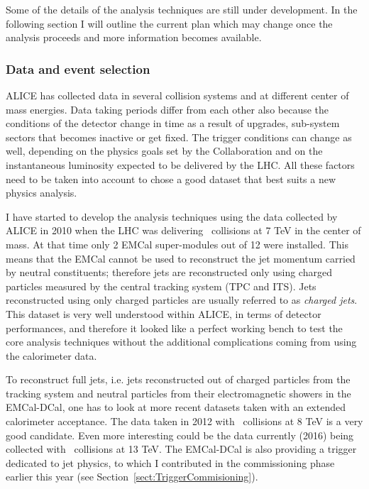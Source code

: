 \documentclass[12pt, a4paper, twoside, titlepage]{article}
\begin{document}
Some of the details of the analysis techniques are still under development. In the following section
I will outline the current plan which may change once the analysis proceeds and more information becomes available.

\subsubsection{Data and event selection}
ALICE has collected data in several collision systems and at different center of mass energies.
Data taking periods differ from each other also because the conditions of the detector change in time as a result of upgrades,
sub-system sectors that becomes inactive or get fixed. The trigger conditions can change as well, depending on the
physics goals set by the Collaboration and on the instantaneous luminosity expected to be delivered by the LHC.
All these factors need to be taken into account to chose a good dataset that best suits a new physics analysis.

I have started to develop the analysis techniques using the data collected by ALICE in 2010 when the LHC was
delivering \pp\ collisions at 7 TeV in the center of mass. At that time only 2 EMCal super-modules out of 12 were installed.
This means that the EMCal cannot be used to reconstruct the jet momentum carried by neutral constituents; therefore jets are
reconstructed only using charged particles measured by the central tracking system (TPC and ITS).
Jets reconstructed using only charged particles are usually referred to as \emph{charged jets}. This dataset is very
well understood within ALICE, in terms of detector performances, and therefore it looked like a perfect working bench
to test the core analysis techniques without the additional complications coming from using the calorimeter data.

To reconstruct full jets, i.e. jets reconstructed out of charged particles from the tracking system and neutral particles from their
electromagnetic showers in the EMCal-DCal, one has to look at more recent datasets taken with an extended calorimeter acceptance.
The data taken in 2012 with \pp\ collisions at 8 TeV is a very good candidate. Even more interesting could be the data currently (2016)
being collected with \pp\ collisions at 13 TeV. The EMCal-DCal is also providing a trigger dedicated to jet physics, 
to which I contributed in the commissioning phase earlier this year (see Section~\ref{sect:TriggerCommisioning}).
\end{document}
